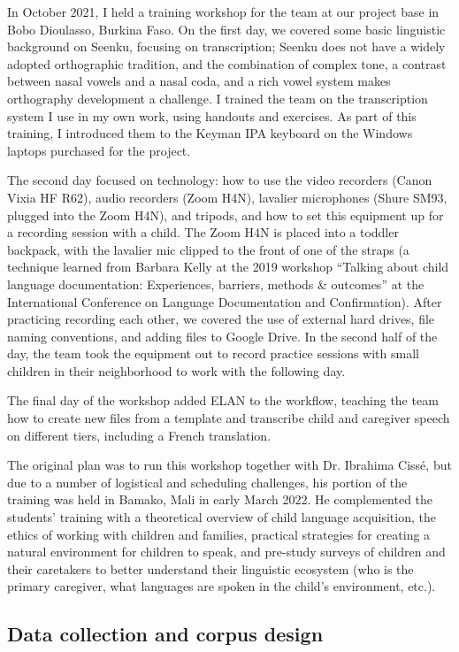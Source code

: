 \documentclass[output=paper,colorlinks,citecolor=brown,
]{langscibook}
\begin{document}
In October 2021, I held a training workshop for the team at our project base in Bobo Dioulasso, Burkina Faso. On the first day, we covered some basic linguistic background on Seenku, focusing on transcription; Seenku does not have a widely adopted orthographic tradition, and the combination of complex tone, a contrast between nasal vowels and a nasal coda, and a rich vowel system makes orthography development a challenge. I trained the team on the transcription system I use in my own work, using handouts and exercises. As part of this training, I introduced them to the Keyman IPA keyboard on the Windows laptops purchased for the project. 

The second day focused on technology: how to use the video recorders (Canon Vixia HF R62), audio recorders (Zoom H4N), lavalier microphones (Shure SM93, plugged into the Zoom H4N), and tripods, and how to set this equipment up for a recording session with a child. The Zoom H4N is placed into a toddler backpack, with the lavalier mic clipped to the front of one of the straps (a technique learned from Barbara Kelly at the 2019 workshop ``Talking about child language documentation: Experiences, barriers, methods \& outcomes'' at the International Conference on Language Documentation and Confirmation). After practicing recording each other, we covered the use of external hard drives, file naming conventions, and adding files to Google Drive. In the second half of the day, the team took the equipment out to record practice sessions with small children in their neighborhood to work with the following day. 

The final day of the workshop added ELAN to the workflow, teaching the team how to create new files from a template and transcribe child and caregiver speech on different tiers, including a French translation.

The original plan was to run this workshop together with Dr. Ibrahima Cissé, but due to a number of logistical and scheduling challenges, his portion of the training was held in Bamako, Mali in early March 2022. He complemented the students' training with a theoretical overview of child language acquisition, the ethics of working with children and families, practical strategies for creating a natural environment for children to speak, and pre-study surveys of children and their caretakers to better understand their linguistic ecosystem (who is the primary caregiver, what languages are spoken in the child's environment, etc.). 

\subsection{Data collection and corpus design}
\end{document}
